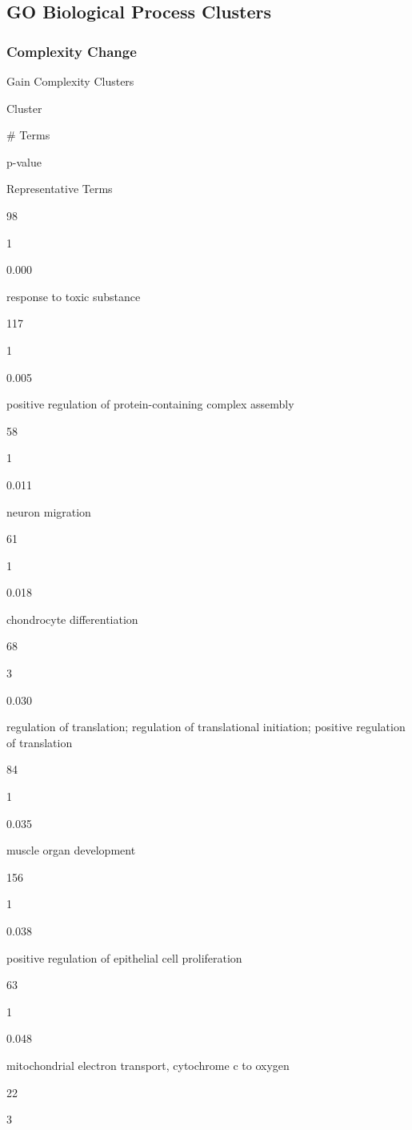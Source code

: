 \documentclass[
  letterpaper,
  DIV=11,
  numbers=noendperiod,
  openany,
  oneside]{scrreprt}
\begin{document}
\subsection{GO Biological Process Clusters}

\subsubsection{Complexity Change}

Gain Complexity Clusters

Cluster

\# Terms

p-value

Representative Terms

98

1

0.000

response to toxic substance

117

1

0.005

positive regulation of protein-containing complex assembly

58

1

0.011

neuron migration

61

1

0.018

chondrocyte differentiation

68

3

0.030

regulation of translation; regulation of translational initiation;
positive regulation of translation

84

1

0.035

muscle organ development

156

1

0.038

positive regulation of epithelial cell proliferation

63

1

0.048

mitochondrial electron transport, cytochrome c to oxygen

22

3
\end{document}
